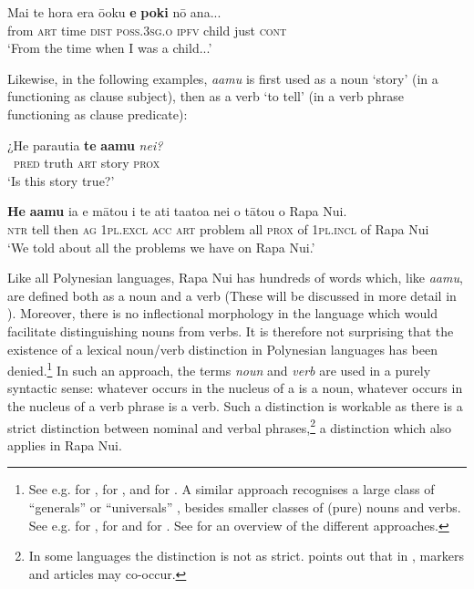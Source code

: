 \ea\label{ex:3.2}
\gll Mai te hora era ō{\ꞌ}oku \textbf{e} \textbf{poki} nō {\ꞌ}ana... \\
from \textsc{art} time \textsc{dist} \textsc{poss.3sg.o} \textsc{ipfv} child just \textsc{cont} \\
\glt
‘From the time when I was a child...’ \textstyleExampleref{[R539-1.614]}
\z

Likewise, in the following examples, \textit{\mbox{{\ꞌ}a{\ꞌ}amu}} is first used as a noun ‘story’ (in a  functioning as clause subject), then as a verb ‘to tell’ (in a verb phrase functioning as clause predicate):

\ea\label{ex:3.3}
\gll ¿He parauti{\ꞌ}a \textbf{te} \textbf{{\ꞌ}a{\ꞌ}amu} \textit{nei?}\\
~\textsc{pred} truth \textsc{art} story \textsc{prox}\\

\glt 
‘Is this story true?’ \textstyleExampleref{ [R616.608]} 
\z

\ea\label{ex:3.4}
\gll \textbf{He} \textbf{{\ꞌ}a{\ꞌ}amu} ia e mātou i te {\ꞌ}ati ta{\ꞌ}ato{\ꞌ}a nei o tātou o Rapa Nui.\\
\textsc{ntr} tell then \textsc{ag} \textsc{1pl.excl} \textsc{acc} \textsc{art} problem all \textsc{prox} of \textsc{1pl.incl} of Rapa Nui\\

\glt
‘We told about all the problems we have on Rapa Nui.’ \textstyleExampleref{[R649.238]} 
\z

Like all Polynesian languages, Rapa Nui has hundreds of words which, like \textit{\mbox{{\ꞌ}a{\ꞌ}amu}}, are defined both as a noun and a verb (These will be discussed in more detail in ). Moreover, there is no inflectional morphology in the language which would facilitate distinguishing nouns from verbs. It is therefore not surprising that the existence of a lexical noun/verb distinction in Polynesian languages has been denied.\footnote{\label{fn:89}See e.g. \citet{MoselHovdhaugen1992} for , \citet{LazardPeltzer1991,LazardPeltzer2000} for , and \citet{ElbertPukui1979} for . A similar approach recognises a large class of “generals” \citep{Biggs1961} or “universals” \citep{Biggs1973}, besides smaller classes of (pure) nouns and verbs. See e.g. \citet{Buse1963Verbal,Buse1965} for , \citet{Tchekhoff1979} for  and \citet{Biggs1961,Biggs1973} for . See \citet{Vonen2000} for an overview of the different approaches.}  In such an approach, the terms \textit{noun} and \textit{verb} are used in a purely syntactic sense: whatever occurs in the nucleus of a  is a noun, whatever occurs in the nucleus of a verb phrase is a verb. Such a distinction is workable as there is a strict distinction between nominal and verbal phrases,\footnote{\label{fn:90}In some languages the distinction is not as strict. \citet[168]{Moyse-Faurie2005} points out that in ,  markers and articles may co-occur.} a distinction which also applies in Rapa Nui.

